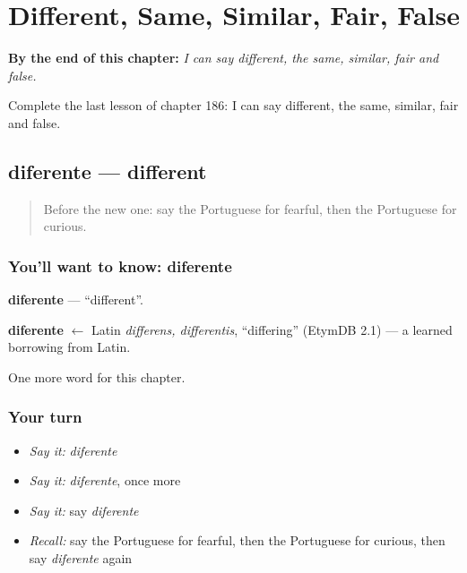 
\chapter{Different, Same, Similar, Fair, False}
\label{ch:pt-different-same-similar-fair-false}

\begin{chapteropening}
\textbf{By the end of this chapter:} \emph{I can say different, the same, similar, fair and false.}

Complete the last lesson of chapter 186: I can say different, the same, similar, fair and false.
\end{chapteropening}

\section[diferente]{diferente — different}

\label{lesson:PT-C186-diferente}



\begin{quote}
Before the new one: say the Portuguese for fearful, then the Portuguese for curious.
\end{quote}

\subsection*{You'll want to know: diferente}
\textbf{diferente} — \textquotedblleft{}different\textquotedblright{}.

\begin{cousinweb}
\textbf{diferente} $\leftarrow$ Latin \emph{differens, differentis}, \textquotedblleft{}differing\textquotedblright{} (EtymDB 2.1) — a learned borrowing from Latin.
\end{cousinweb}

\begin{grammarlens}[title={What you've built}]
One more word for this chapter.
\end{grammarlens}

\subsection*{Your turn}
\begin{itemize}
\raggedright
  \item \emph{Say it:} \emph{diferente}
  \item \emph{Say it:} \emph{diferente}, once more
  \item \emph{Say it:} say \emph{diferente}
  \item \emph{Recall:} say the Portuguese for fearful, then the Portuguese for curious, then say \emph{diferente} again
\end{itemize}

